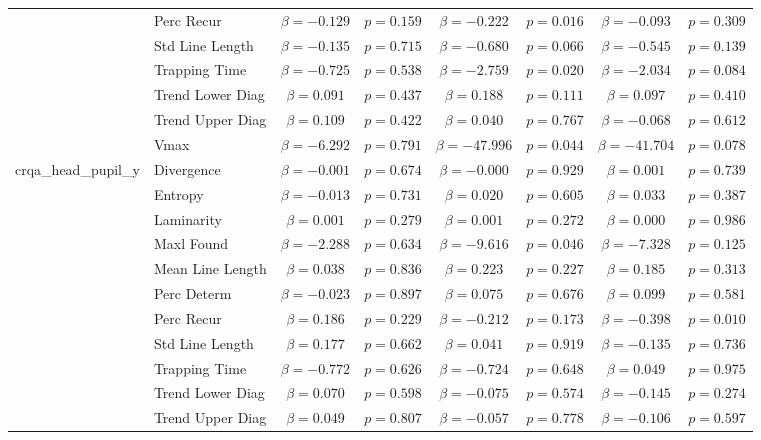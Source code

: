 \begin{tabular}{llcc|cc|cc}
 & Perc Recur & $\beta = -0.129$ & $p = 0.159$ & $\beta = -0.222$ & $p = 0.016$ & $\beta = -0.093$ & $p = 0.309$ \\
 & Std Line Length & $\beta = -0.135$ & $p = 0.715$ & $\beta = -0.680$ & $p = 0.066$ & $\beta = -0.545$ & $p = 0.139$ \\
 & Trapping Time & $\beta = -0.725$ & $p = 0.538$ & $\beta = -2.759$ & $p = 0.020$ & $\beta = -2.034$ & $p = 0.084$ \\
 & Trend Lower Diag & $\beta = 0.091$ & $p = 0.437$ & $\beta = 0.188$ & $p = 0.111$ & $\beta = 0.097$ & $p = 0.410$ \\
 & Trend Upper Diag & $\beta = 0.109$ & $p = 0.422$ & $\beta = 0.040$ & $p = 0.767$ & $\beta = -0.068$ & $p = 0.612$ \\
 & Vmax & $\beta = -6.292$ & $p = 0.791$ & $\beta = -47.996$ & $p = 0.044$ & $\beta = -41.704$ & $p = 0.078$ \\
\midrule
\multirow{12}{*}{crqa_head_pupil_y} & Divergence & $\beta = -0.001$ & $p = 0.674$ & $\beta = -0.000$ & $p = 0.929$ & $\beta = 0.001$ & $p = 0.739$ \\
 & Entropy & $\beta = -0.013$ & $p = 0.731$ & $\beta = 0.020$ & $p = 0.605$ & $\beta = 0.033$ & $p = 0.387$ \\
 & Laminarity & $\beta = 0.001$ & $p = 0.279$ & $\beta = 0.001$ & $p = 0.272$ & $\beta = 0.000$ & $p = 0.986$ \\
 & Maxl Found & $\beta = -2.288$ & $p = 0.634$ & $\beta = -9.616$ & $p = 0.046$ & $\beta = -7.328$ & $p = 0.125$ \\
 & Mean Line Length & $\beta = 0.038$ & $p = 0.836$ & $\beta = 0.223$ & $p = 0.227$ & $\beta = 0.185$ & $p = 0.313$ \\
 & Perc Determ & $\beta = -0.023$ & $p = 0.897$ & $\beta = 0.075$ & $p = 0.676$ & $\beta = 0.099$ & $p = 0.581$ \\
 & Perc Recur & $\beta = 0.186$ & $p = 0.229$ & $\beta = -0.212$ & $p = 0.173$ & $\beta = -0.398$ & $p = 0.010$ \\
 & Std Line Length & $\beta = 0.177$ & $p = 0.662$ & $\beta = 0.041$ & $p = 0.919$ & $\beta = -0.135$ & $p = 0.736$ \\
 & Trapping Time & $\beta = -0.772$ & $p = 0.626$ & $\beta = -0.724$ & $p = 0.648$ & $\beta = 0.049$ & $p = 0.975$ \\
 & Trend Lower Diag & $\beta = 0.070$ & $p = 0.598$ & $\beta = -0.075$ & $p = 0.574$ & $\beta = -0.145$ & $p = 0.274$ \\
 & Trend Upper Diag & $\beta = 0.049$ & $p = 0.807$ & $\beta = -0.057$ & $p = 0.778$ & $\beta = -0.106$ & $p = 0.597$ \\

\end{tabular}
